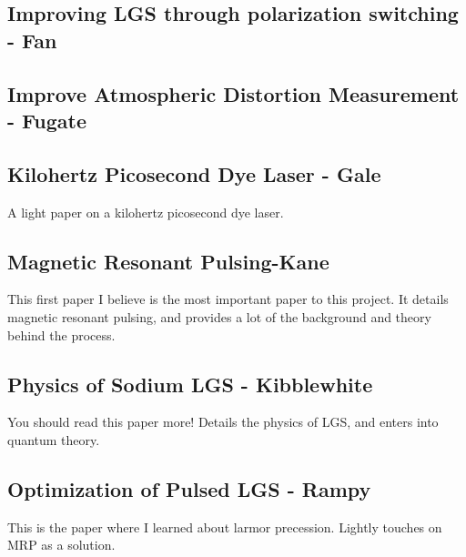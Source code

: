 \documentclass{article}
\begin{document}
\pagebreak

\subsection{Improving LGS through polarization switching - Fan}

\pagebreak

\pagebreak

\subsection{Improve Atmospheric Distortion Measurement - Fugate}
\pagebreak


\pagebreak

\subsection{Kilohertz Picosecond Dye Laser - Gale}
A light paper on a kilohertz picosecond dye laser.

\pagebreak

\pagebreak

\subsection{Magnetic Resonant Pulsing-Kane}
This first paper I believe is the most important paper to this project. It details magnetic resonant pulsing, and provides a lot of the background and theory behind the process.

\pagebreak



\pagebreak

\subsection{Physics of Sodium LGS - Kibblewhite}
You should read this paper more! Details the physics of LGS, and enters into quantum theory.

\pagebreak

\pagebreak

\subsection{Optimization of Pulsed LGS - Rampy}
This is the paper where I learned about larmor precession. Lightly touches on MRP as a solution.
\pagebreak

\pagebreak
\end{document}
